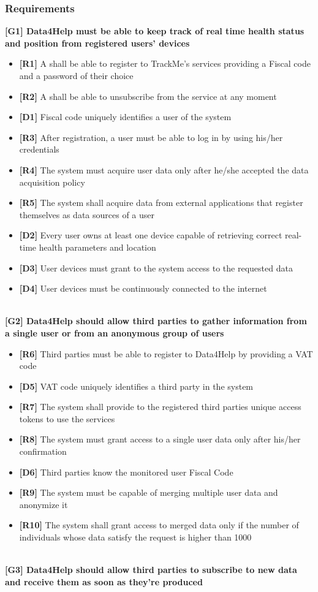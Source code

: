 \subsubsection{Requirements}
\textbf{[G1] Data4Help must be able to keep track of real time health status and position from registered users' devices}
\begin{itemize}
	\item \textbf{[R1]} A shall be able to register to TrackMe's services providing a Fiscal code and a password of their choice
	\item \textbf{[R2]} A shall be able to unsubscribe from the service at any moment
	\item \textbf{[D1]} Fiscal code uniquely identifies a user of the system
	\item \textbf{[R3]} After registration, a user must be able to log in by using his/her credentials
	\item \textbf{[R4]} The system must acquire user data only after he/she accepted the data acquisition policy
	\item \textbf{[R5]} The system shall acquire data from external applications that register themselves as data sources of a user
	\item \textbf{[D2]} Every user owns at least one device capable of retrieving correct real-time health parameters and location
	\item \textbf{[D3]} User devices must grant to the system access to the requested data
	\item \textbf{[D4]} User devices must be continuously connected to the internet
\end{itemize}
\\
\textbf{[G2] Data4Help should allow third parties to gather information from a single user or from an anonymous group of users}
\begin{itemize}
	\item \textbf{[R6]} Third parties must be able to register to Data4Help by providing a VAT code
	\item \textbf{[D5]} VAT code uniquely identifies a third party in the system
	\item \textbf{[R7]} The system shall provide to the registered third parties unique access tokens to use the services
	\item \textbf{[R8]} The system must grant access to a single user data only after his/her confirmation
	\item \textbf{[D6]} Third parties know the monitored user Fiscal Code
	\item \textbf{[R9]} The system must be capable of merging multiple user data and anonymize it
	\item \textbf{[R10]} The system shall grant access to merged data only if the number	of individuals	whose data satisfy the request is higher than	 1000
\end{itemize}
\\
\textbf{[G3] Data4Help should allow third parties to subscribe to new data and receive them as soon as they're produced}

